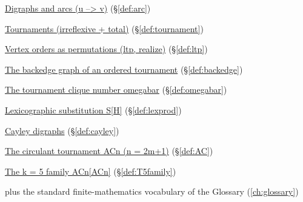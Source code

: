 \begin{closurepanel}
\item \hyperref[def:arc]{Digraphs and arcs (u --> v)} (\S\ref*{def:arc})
\item \hyperref[def:tournament]{Tournaments (irreflexive + total)} (\S\ref*{def:tournament})
\item \hyperref[def:ltp]{Vertex orders as permutations (ltp, realize)} (\S\ref*{def:ltp})
\item \hyperref[def:backedge]{The backedge graph of an ordered tournament} (\S\ref*{def:backedge})
\item \hyperref[def:omegabar]{The tournament clique number omegabar} (\S\ref*{def:omegabar})
\item \hyperref[def:lexprod]{Lexicographic substitution S[H]} (\S\ref*{def:lexprod})
\item \hyperref[def:cayley]{Cayley digraphs} (\S\ref*{def:cayley})
\item \hyperref[def:AC]{The circulant tournament ACn (n = 2m+1)} (\S\ref*{def:AC})
\item \hyperref[def:T5family]{The k = 5 family ACn[ACn]} (\S\ref*{def:T5family})
\item plus the standard finite-mathematics vocabulary of the Glossary (\cref{ch:glossary})
\end{closurepanel}
